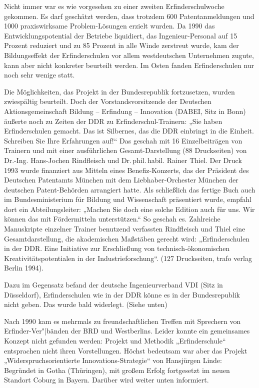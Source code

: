 \documentclass[11pt,a4paper]{article}
\begin{document}
Nicht immer war es wie vorgesehen zu einer zweiten Erfinderschulwoche gekommen.
Es darf geschätzt werden, dass trotzdem 600 Patentanmeldungen und 1000
praxiswirksame Problem-Lösungen erzielt wurden. Da 1990 das
Entwicklungspotential der Betriebe liquidiert, das Ingenieur-Personal auf 15
Prozent reduziert und zu 85 Prozent in alle Winde zerstreut wurde, kam der
Bildungseffekt der Erfinderschulen vor allem westdeutschen Unternehmen zugute,
kann aber nicht konkreter beurteilt werden. Im Osten fanden Erfinderschulen nur
noch sehr wenige statt.

Die Möglichkeiten, das Projekt in der Bundesrepublik fortzusetzen, wurden
zwiespältig beurteilt. Doch der Vorstandsvorsitzende der Deutschen
Aktionsgemeinschaft Bildung – Erfindung – Innovation (DABEI, Sitz in Bonn)
äußerte noch zu Zeiten der DDR zu Erfinderschul-Trainern: „Sie haben
Erfinderschulen gemacht. Das ist Silbernes, das die DDR einbringt in die
Einheit.  Schreiben Sie Ihre Erfahrungen auf!“ Das geschah mit 16
Einzelbeiträgen von Trainern und mit einer ausführlichen Gesamt-Darstellung (88
Druckseiten) von Dr.-Ing. Hans-Jochen Rindfleisch und Dr.\,phil.\,habil. Rainer
Thiel.  Der Druck 1993 wurde finanziert aus Mitteln eines Benefiz-Konzerts, das
der Präsident des Deutschen Patentamts München mit dem Liebhaber-Orchester
München der deutschen Patent-Behörden arrangiert hatte. Als schließlich das
fertige Buch auch im Bundesministerium für Bildung und Wissenschaft präsentiert
wurde, empfahl dort ein Abteilungsleiter: „Machen Sie doch eine solche Edition
auch für uns. Wir können das mit Fördermitteln unterstützen.“ So geschah es.
Zahlreiche Manuskripte einzelner Trainer benutzend verfassten Rindfleisch und
Thiel eine Gesamtdarstellung, die akademischen Maßstäben gerecht wird:
„Erfinderschulen in der DDR. Eine Initiative zur Erschließung von
technisch-ökonomischen Kreativitätspotentialen in der Industrieforschung“. (127
Druckseiten, trafo verlag Berlin 1994).

Dazu im Gegensatz befand der deutsche Ingenieurverband VDI (Sitz in
Düsseldorf), Erfinderschulen wie in der DDR könne es in der Bundesrepublik
nicht geben. Das wurde bald widerlegt. (Siehe unten)

Nach 1990 kam es mehrmals zu freundschaftlichen Treffen mit Sprechern von
Erfinder-Ver"|bänden der BRD und Westberlins. Leider konnte ein gemeinsames
Konzept nicht gefunden werden: Projekt und Methodik „Erfinderschule“
entsprachen nicht ihren Vorstellungen. Höchst bedeutsam war aber das Projekt
„Widerspruchsorientierte Innovations-Strategie“ von Hansjürgen Linde: Begründet
in Gotha (Thüringen), mit großem Erfolg fortgesetzt im neuen Standort Coburg in
Bayern. Darüber wird weiter unten informiert.
\end{document}
